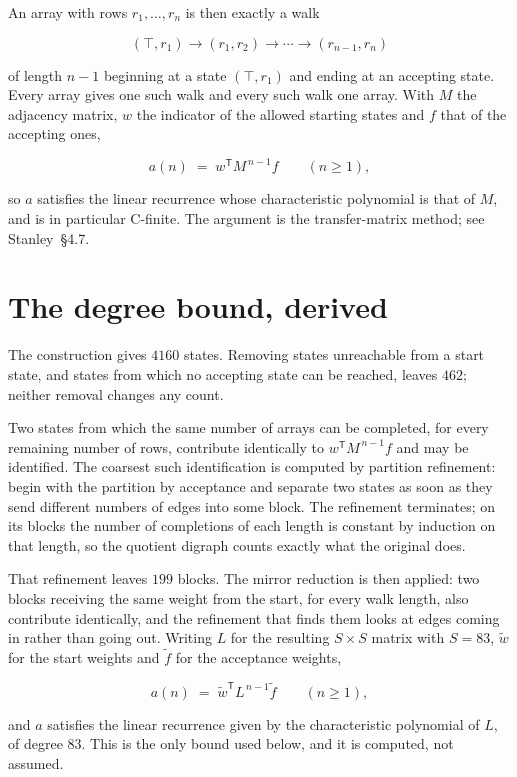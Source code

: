 \documentclass[11pt]{article}
\theoremstyle{definition}
\begin{document}
An array with rows $r_1,\dots,r_n$ is then exactly a walk

\[(\top,r_1) \to (r_1,r_2) \to \cdots \to (r_{n-1},r_n)\]

of length $n-1$ beginning at a state $(\top,r_1)$ and ending at an accepting state. Every array gives one such walk and every such walk one array. With $M$ the adjacency matrix, $w$ the indicator of the allowed starting states and $f$ that of the accepting ones,

\[a(n) \;=\; w^{\mathsf T} M^{\,n-1} f \qquad (n \ge 1),\]

so $a$ satisfies the linear recurrence whose characteristic polynomial is that of $M$, and is in particular C-finite. The argument is the transfer-matrix method; see Stanley~\S4.7.

\section{The degree bound, derived}

The construction gives $4160$ states. Removing states unreachable from a start state, and states from which no accepting state can be reached, leaves $462$; neither removal changes any count.

Two states from which the same number of arrays can be completed, for every remaining number of rows, contribute identically to $w^{\mathsf T}M^{\,n-1}f$ and may be identified. The coarsest such identification is computed by partition refinement: begin with the partition by acceptance and separate two states as soon as they send different numbers of edges into some block. The refinement terminates; on its blocks the number of completions of each length is constant by induction on that length, so the quotient digraph counts exactly what the original does.

That refinement leaves $199$ blocks. The mirror reduction is then applied: two blocks receiving the same weight from the start, for every walk length, also contribute identically, and the refinement that finds them looks at edges coming in rather than going out. Writing $L$ for the resulting $S \times S$ matrix with $S = 83$, $\tilde w$ for the start weights and $\tilde f$ for the acceptance weights,

\[a(n) \;=\; \tilde w^{\mathsf T} L^{\,n-1} \tilde f \qquad (n \ge 1),\]

and $a$ satisfies the linear recurrence given by the characteristic polynomial of $L$, of degree $83$. This is the only bound used below, and it is computed, not assumed.
\end{document}
